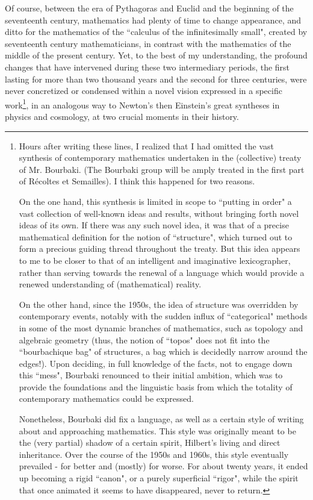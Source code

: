Of course, between the era of Pythagoras and Euclid and the beginning of the seventeenth century, mathematics had plenty of time to change appearance, and ditto for the mathematics of the ``calculus of the infinitesimally small", created by seventeenth century mathematicians, in contrast with the mathematics of the middle of the present century. Yet, to the best of my understanding, the profound changes that have intervened during these two intermediary periods, the first lasting for more than two thousand years and the second for three centuries, were never concretized or condensed within a novel vision expressed in a specific work\footnote{Hours after writing these lines, I realized that I had omitted the vast synthesis of contemporary mathematics undertaken in the (collective) treaty of Mr. Bourbaki. (The Bourbaki group will be amply treated in the first part of R\'ecoltes et Semailles). I think this happened for two reasons. 

On the one hand, this synthesis is limited in scope to ``putting in order" a vast collection of well-known ideas and results, without bringing forth novel ideas of its own. If there was any such novel idea, it was that of a precise mathematical definition for the notion of ``structure", which turned out to form a precious guiding thread throughout the treaty. But this idea appears to me to be closer to that of an intelligent and imaginative lexicographer, rather than serving towards the renewal of a language which would provide a renewed understanding of (mathematical) reality.

On the other hand, since the 1950s, the idea of structure was overridden by contemporary events, notably with the sudden influx of ``categorical" methods in some of the most dynamic branches of mathematics, such as topology and algebraic geometry (thus, the notion of ``topos" does not fit into the ``bourbachique bag" of structures, a bag which is decidedly narrow around the edges!). Upon deciding, in full knowledge of the facts, not to engage down this ``mess", Bourbaki renounced to their initial ambition, which was to provide the foundations and the linguistic basis from which the totality of contemporary mathematics could be expressed.

Nonetheless, Bourbaki did fix a language, as well as a certain style of writing about and approaching mathematics. This style was originally meant to be the (very partial) shadow of a certain spirit, Hilbert's living and direct inheritance. Over the course of the 1950s and 1960s, this style eventually prevailed - for better and (mostly) for worse. For about twenty years, it ended up becoming a rigid ``canon", or a purely superficial ``rigor", while the spirit that once animated it seems to have disappeared, never to return.}, in an analogous way to Newton's then Einstein's great syntheses in physics and cosmology, at two crucial moments in their history. 

